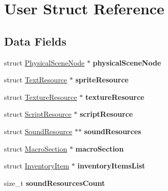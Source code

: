 \hypertarget{struct_user}{}\section{User Struct Reference}
\label{struct_user}
\subsection*{Data Fields}
\begin{DoxyCompactItemize}
\item 
\hypertarget{struct_user_a56a0370780499062e6f778b7539adfda}{}\label{struct_user_a56a0370780499062e6f778b7539adfda} 
struct \hyperlink{struct_physical_scene_node}{Physical\+Scene\+Node} $\ast$ {\bfseries physical\+Scene\+Node}
\item 
\hypertarget{struct_user_ac402150bd2243d7a6f04756f7b624fa1}{}\label{struct_user_ac402150bd2243d7a6f04756f7b624fa1} 
struct \hyperlink{struct_text_resource}{Text\+Resource} $\ast$ {\bfseries sprite\+Resource}
\item 
\hypertarget{struct_user_aedd0da0c072332f83e64105f8682bbdf}{}\label{struct_user_aedd0da0c072332f83e64105f8682bbdf} 
struct \hyperlink{struct_texture_resource}{Texture\+Resource} $\ast$ {\bfseries texture\+Resource}
\item 
\hypertarget{struct_user_abc27117170d75eb9af11c98fd2d5d855}{}\label{struct_user_abc27117170d75eb9af11c98fd2d5d855} 
struct \hyperlink{struct_script_resource}{Script\+Resource} $\ast$ {\bfseries script\+Resource}
\item 
\hypertarget{struct_user_ae92accb405fd841a8d0cd3bb2161b53a}{}\label{struct_user_ae92accb405fd841a8d0cd3bb2161b53a} 
struct \hyperlink{struct_sound_resource}{Sound\+Resource} $\ast$$\ast$ {\bfseries sound\+Resources}
\item 
\hypertarget{struct_user_ad5e849d2b515ee267c3bd8d95c6781c5}{}\label{struct_user_ad5e849d2b515ee267c3bd8d95c6781c5} 
struct \hyperlink{struct_macro_section}{Macro\+Section} $\ast$ {\bfseries macro\+Section}
\item 
\hypertarget{struct_user_a278e5f835be84f8df6c155f8e2a4101d}{}\label{struct_user_a278e5f835be84f8df6c155f8e2a4101d} 
struct \hyperlink{struct_inventory_item}{Inventory\+Item} $\ast$ {\bfseries inventory\+Items\+List}
\item 
\hypertarget{struct_user_ab954cc6c43743c2c3826407b6ada7b20}{}\label{struct_user_ab954cc6c43743c2c3826407b6ada7b20} 
size\+\_\+t {\bfseries sound\+Resources\+Count}
\item 
\hypertarget{struct_user_a468e1f1dbde8028ff761045261ff1e00}{}\label{struct_user_a468e1f1dbde8028ff761045261ff1e00} 
$$
\end{DoxyCompactItemize}
